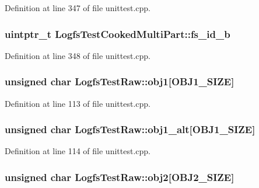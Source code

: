 \-Definition at line 347 of file unittest.\-cpp.

\hypertarget{group___unit_tests_ga2398cf58e337f70603e12a997936f0c9}{
\subsubsection[{fs\-\_\-id\-\_\-b}]{\setlength{\rightskip}{0pt plus 5cm}uintptr\-\_\-t {\bf \-Logfs\-Test\-Cooked\-Multi\-Part\-::fs\-\_\-id\-\_\-b}}}\label{group___unit_tests_ga2398cf58e337f70603e12a997936f0c9}


\-Definition at line 348 of file unittest.\-cpp.

\hypertarget{group___unit_tests_ga9a310807ae65fdb582ace246798d9112}{
\subsubsection[{obj1}]{\setlength{\rightskip}{0pt plus 5cm}unsigned char {\bf \-Logfs\-Test\-Raw\-::obj1}\mbox{[}\-O\-B\-J1\-\_\-\-S\-I\-Z\-E\mbox{]}}}\label{group___unit_tests_ga9a310807ae65fdb582ace246798d9112}


\-Definition at line 113 of file unittest.\-cpp.

\hypertarget{group___unit_tests_gab4d553b9c4a87a6f45e032b57f98a751}{
\subsubsection[{obj1\-\_\-alt}]{\setlength{\rightskip}{0pt plus 5cm}unsigned char {\bf \-Logfs\-Test\-Raw\-::obj1\-\_\-alt}\mbox{[}\-O\-B\-J1\-\_\-\-S\-I\-Z\-E\mbox{]}}}\label{group___unit_tests_gab4d553b9c4a87a6f45e032b57f98a751}


\-Definition at line 114 of file unittest.\-cpp.

\hypertarget{group___unit_tests_ga8ed143a62924cbb11a0150f51b0f39e9}{
\subsubsection[{obj2}]{\setlength{\rightskip}{0pt plus 5cm}unsigned char {\bf \-Logfs\-Test\-Raw\-::obj2}\mbox{[}\-O\-B\-J2\-\_\-\-S\-I\-Z\-E\mbox{]}}}\label{group___unit_tests_ga8ed143a62924cbb11a0150f51b0f39e9}


